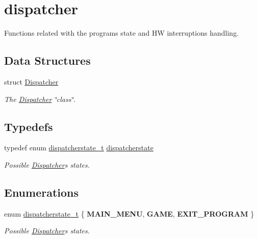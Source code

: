 \hypertarget{group__dispatcher}{}\section{dispatcher}
\label{group__dispatcher}


Functions related with the program\textquotesingle{}s state and HW interruptions handling.  


\subsection*{Data Structures}
\begin{DoxyCompactItemize}
\item 
struct \hyperlink{struct_dispatcher}{Dispatcher}
\begin{DoxyCompactList}\small\item\em The \hyperlink{struct_dispatcher}{Dispatcher} \char`\"{}class\char`\"{}. \end{DoxyCompactList}\end{DoxyCompactItemize}
\subsection*{Typedefs}
\begin{DoxyCompactItemize}
\item 
\hypertarget{group__dispatcher_gafe31418b86c6754be94c8e79cfeed813}{}\label{group__dispatcher_gafe31418b86c6754be94c8e79cfeed813} 
typedef enum \hyperlink{group__dispatcher_ga90e75071da8646d19ce0a3cd2926af3a}{dispatcherstate\+\_\+t} \hyperlink{group__dispatcher_gafe31418b86c6754be94c8e79cfeed813}{dispatcherstate}
\begin{DoxyCompactList}\small\item\em Possible \hyperlink{struct_dispatcher}{Dispatcher}\textquotesingle{}s states. \end{DoxyCompactList}\end{DoxyCompactItemize}
\subsection*{Enumerations}
\begin{DoxyCompactItemize}
\item 
\hypertarget{group__dispatcher_ga90e75071da8646d19ce0a3cd2926af3a}{}\label{group__dispatcher_ga90e75071da8646d19ce0a3cd2926af3a} 
enum \hyperlink{group__dispatcher_ga90e75071da8646d19ce0a3cd2926af3a}{dispatcherstate\+\_\+t} \{ {\bfseries M\+A\+I\+N\+\_\+\+M\+E\+NU}, 
{\bfseries G\+A\+ME}, 
{\bfseries E\+X\+I\+T\+\_\+\+P\+R\+O\+G\+R\+AM}
 \}\begin{DoxyCompactList}\small\item\em Possible \hyperlink{struct_dispatcher}{Dispatcher}\textquotesingle{}s states. \end{DoxyCompactList}
\end{DoxyCompactItemize}
